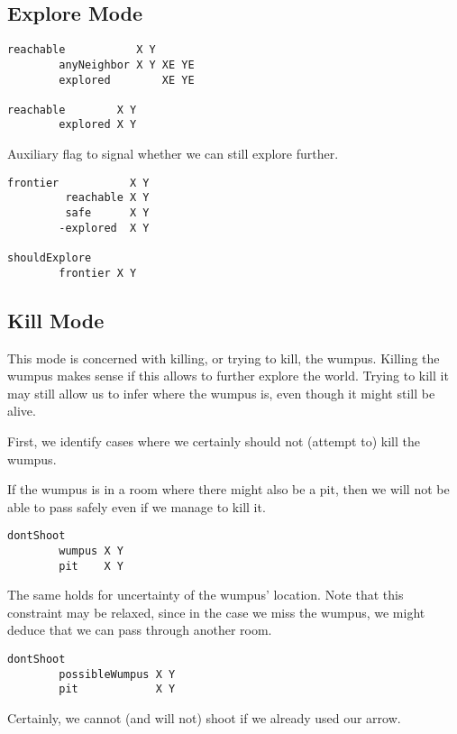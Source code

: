 \hypertarget{explore-mode}{%
\subsection{Explore Mode}\label{explore-mode}}

\begin{verbatim}
reachable           X Y
        anyNeighbor X Y XE YE
        explored        XE YE

reachable        X Y
        explored X Y
\end{verbatim}

Auxiliary flag to signal whether we can still explore further.

\begin{verbatim}
frontier           X Y
         reachable X Y
         safe      X Y
        -explored  X Y

shouldExplore
        frontier X Y
\end{verbatim}

\hypertarget{kill-mode}{%
\subsection{Kill Mode}\label{kill-mode}}

This mode is concerned with killing, or trying to kill, the wumpus.
Killing the wumpus makes sense if this allows to further explore the
world. Trying to kill it may still allow us to infer where the wumpus
is, even though it might still be alive.

First, we identify cases where we certainly should not (attempt to) kill
the wumpus.

If the wumpus is in a room where there might also be a pit, then we will
not be able to pass safely even if we manage to kill it.

\begin{verbatim}
dontShoot
        wumpus X Y
        pit    X Y
\end{verbatim}

The same holds for uncertainty of the wumpus' location. Note that this
constraint may be relaxed, since in the case we miss the wumpus, we
might deduce that we can pass through another room.

\begin{verbatim}
dontShoot
        possibleWumpus X Y
        pit            X Y
\end{verbatim}

Certainly, we cannot (and will not) shoot if we already used our arrow.

